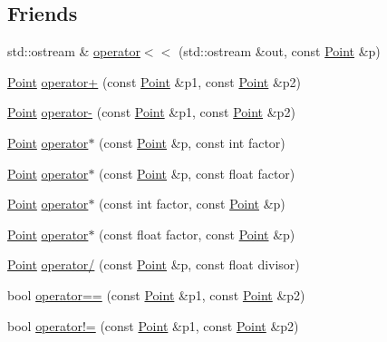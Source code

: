 \subsection*{Friends}
\begin{DoxyCompactItemize}
\item 
std\+::ostream \& \hyperlink{classprism_1_1geometry_1_1_point_aa818efa680e0d94ce91173ccb4b7aa08}{operator$<$$<$} (std\+::ostream \&out, const \hyperlink{classprism_1_1geometry_1_1_point}{Point} \&p)
\item 
\hyperlink{classprism_1_1geometry_1_1_point}{Point} \hyperlink{classprism_1_1geometry_1_1_point_af9fd2d27c54f694ce11ba1e9df0b58f1}{operator+} (const \hyperlink{classprism_1_1geometry_1_1_point}{Point} \&p1, const \hyperlink{classprism_1_1geometry_1_1_point}{Point} \&p2)
\item 
\hyperlink{classprism_1_1geometry_1_1_point}{Point} \hyperlink{classprism_1_1geometry_1_1_point_aff59dfb837229858286c1652bd9a8e40}{operator-\/} (const \hyperlink{classprism_1_1geometry_1_1_point}{Point} \&p1, const \hyperlink{classprism_1_1geometry_1_1_point}{Point} \&p2)
\item 
\hyperlink{classprism_1_1geometry_1_1_point}{Point} \hyperlink{classprism_1_1geometry_1_1_point_a3fff687aebd2165ff57e237363953f36}{operator$\ast$} (const \hyperlink{classprism_1_1geometry_1_1_point}{Point} \&p, const int factor)
\item 
\hyperlink{classprism_1_1geometry_1_1_point}{Point} \hyperlink{classprism_1_1geometry_1_1_point_a6a69d67bbbf8aa38b38c71440a8341cc}{operator$\ast$} (const \hyperlink{classprism_1_1geometry_1_1_point}{Point} \&p, const float factor)
\item 
\hyperlink{classprism_1_1geometry_1_1_point}{Point} \hyperlink{classprism_1_1geometry_1_1_point_ab4cfccba8d1b3c1d29dedb1d729ecaaf}{operator$\ast$} (const int factor, const \hyperlink{classprism_1_1geometry_1_1_point}{Point} \&p)
\item 
\hyperlink{classprism_1_1geometry_1_1_point}{Point} \hyperlink{classprism_1_1geometry_1_1_point_a3141285de569d8565c2ae20e3155de14}{operator$\ast$} (const float factor, const \hyperlink{classprism_1_1geometry_1_1_point}{Point} \&p)
\item 
\hyperlink{classprism_1_1geometry_1_1_point}{Point} \hyperlink{classprism_1_1geometry_1_1_point_adeafa81d7b8a890cbe28b9159aad4eb4}{operator/} (const \hyperlink{classprism_1_1geometry_1_1_point}{Point} \&p, const float divisor)
\item 
bool \hyperlink{classprism_1_1geometry_1_1_point_a2c5b474dd81e3ce9b80b206ea32deaae}{operator==} (const \hyperlink{classprism_1_1geometry_1_1_point}{Point} \&p1, const \hyperlink{classprism_1_1geometry_1_1_point}{Point} \&p2)
\item 
bool \hyperlink{classprism_1_1geometry_1_1_point_a694df69725e33fcd64fd0942c6bb5e82}{operator!=} (const \hyperlink{classprism_1_1geometry_1_1_point}{Point} \&p1, const \hyperlink{classprism_1_1geometry_1_1_point}{Point} \&p2)
\end{DoxyCompactItemize}


